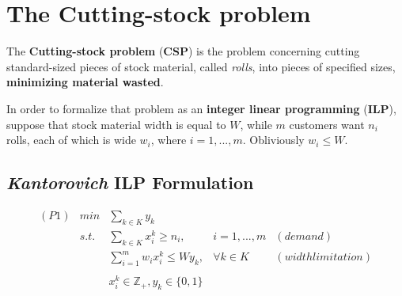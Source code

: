 \documentclass[10pt,a4paper]{article}
\begin{document}
\begin{frontespizio} 
\end{frontespizio} 

\tableofcontents
\newpage


\section{The Cutting-stock problem}



The \textbf{Cutting-stock problem} (\textbf{CSP}) is the problem concerning cutting standard-sized pieces of stock material, called \textit{rolls}, into pieces of specified sizes, \textbf{minimizing material wasted}.



In order to formalize that problem as an \textbf{integer linear programming} (\textbf{ILP}), suppose that stock material width is equal to $W$, while $m$ customers want $n_i$ rolls, each of which is wide $w_i$, where $i = 1,...,m$. Obliviously $w_i \leq W$.



\subsection{\textit{Kantorovich} ILP Formulation }



\begin{equation}\label{eqn:P1}
\begin{array} {lllrr} 

(P1) & min & \displaystyle\sum_{k \in K} y_k && \\
& s.t. & \displaystyle\sum_{k \in K} x_i^k \geq n_i, & i = 1,...,m & (demand) \\
&& \displaystyle\sum_{i = 1}^m w_i x_i^k \leq W y_k, & \forall k \in K & (width limitation) \\\\
&& x_i^k \in \mathbb{Z}_{+}, y_k \in \lbrace 0, 1 \rbrace &&
\end{array}
\end{equation}
\end{document}
